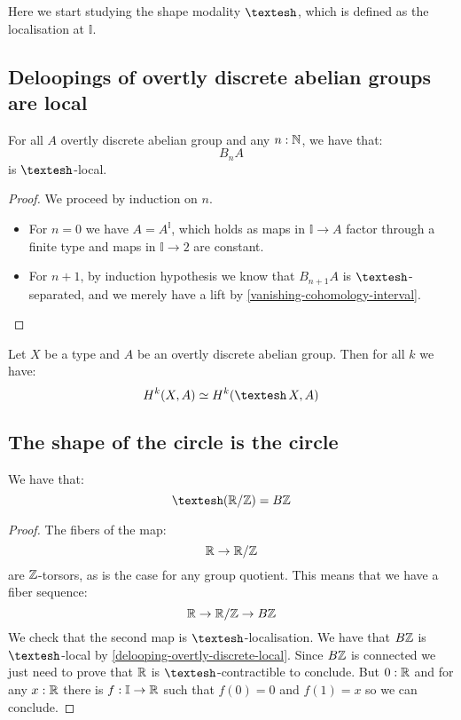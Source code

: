 Here we start studying the shape modality $\shape$, which is defined as the localisation at $\mathbb{I}$.

\subsection{Deloopings of overtly discrete abelian groups are local}

\begin{lemma}\label{delooping-overtly-discrete-local}
For all $A$ overtly discrete abelian group and any $n:\mathbb{N}$, we have that:
\[B_nA\]
is $\shape$-local.
\end{lemma}

\begin{proof}
We proceed by induction on $n$. 
\begin{itemize}
\item For $n=0$ we have $A = A^\mathbb{I}$, which holds as maps in $\mathbb{I}\to A$ factor through a finite type and maps in $\mathbb{I}\to 2$ are constant. 
\item For $n+1$, by induction hypothesis we know that $B_{n+1}A$ is $\shape$-separated, and we merely have a lift by \cref{vanishing-cohomology-interval}.
\end{itemize}
\end{proof}


\begin{corollary}\label{cohomology-shape}
Let $X$ be a type and $A$ be an overtly discrete abelian group. Then for all $k$ we have:
\[H^k(X,A) \simeq H^k(\shape X,A)\]
\end{corollary}



\subsection{The shape of the circle is the circle}

\begin{proposition}
We have that:
\[\shape (\R/\Z) = B\Z\]
\end{proposition}

\begin{proof}
The fibers of the map:
\[\mathbb{R}\to \mathbb{R}/\mathbb{Z}\]
are $\mathbb{Z}$-torsors, as is the case for any group quotient. This means that we have a fiber sequence:
\[\mathbb{R} \to \mathbb{R}/\mathbb{Z} \to B\mathbb{Z}\]
We check that the second map is $\shape$-localisation. We have that $B\mathbb{Z}$ is $\shape$-local by \cref{delooping-overtly-discrete-local}. Since $B\mathbb{Z}$ is connected we just need to prove that $\mathbb{R}$ is $\shape$-contractible to conclude. But $0:\mathbb{R}$ and for any $x:\mathbb{R}$ there is $f:\mathbb{I}\to\mathbb{R}$ such that $f(0)=0$ and $f(1)=x$ so we can conclude.
\end{proof}


